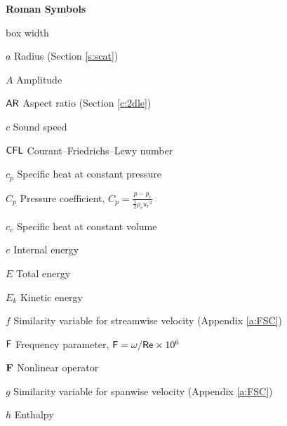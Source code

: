 %
%
%
%
%
\centerline{\Large\bf Roman Symbols}
\bigskip
\begin{descriptionlist}{box width}

\item[$a$]		Radius (Section \ref{s:scat})

\item[$A$]		Amplitude

\item[${\sf AR}$]		Aspect ratio (Section \ref{c:2dle})

\item[$c$]              Sound speed

\item[${\sf CFL}$]           Courant--Friedrichs--Lewy number


\item[$c_p$]            Specific heat at constant pressure %

\item[$C_p$]		Pressure coefficient, $C_p = \frac{p - p_r}
                        {\frac{1}{2}\rho_r {u_r}^2}$

\item[$c_v$]            Specific heat at constant volume

\item[$e$]		Internal energy

\item[$E$]		Total energy

\item[$E_k$]		Kinetic energy

\item[$f$]		Similarity variable for streamwise velocity
                        (Appendix \ref{a:FSC})

\item[${\sf F}$]		Frequency parameter, ${\sf F} = \omega / {\sf Re} \times 10^6$

\item[$\bf F$]		Nonlinear operator

\item[$g$]		Similarity variable for spanwise velocity 
                        (Appendix \ref{a:FSC})

\item[$h$]		Enthalpy


\end{descriptionlist}

